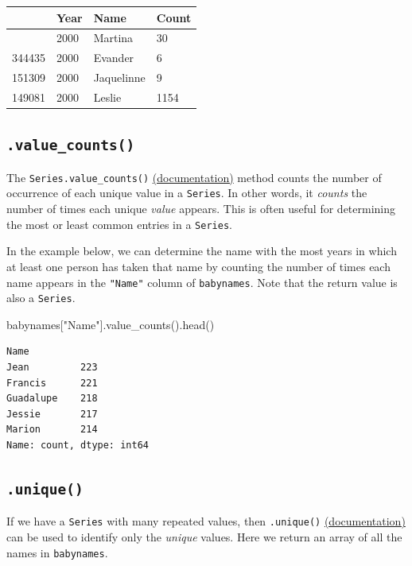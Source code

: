 \documentclass[
  letterpaper,
  DIV=11,
  numbers=noendperiod]{scrreprt}
\newenvironment{Shaded}{\begin{snugshade}}{\end{snugshade}}
\newcommand{\NormalTok}[1]{\textcolor[rgb]{0.00,0.23,0.31}{#1}}
\newcommand{\StringTok}[1]{\textcolor[rgb]{0.13,0.47,0.30}{#1}}
\begin{document}
\begin{longtable}[]{@{}llll@{}}
\toprule\noalign{}
& Year & Name & Count \\
\midrule\noalign{}
\endhead
\bottomrule\noalign{}
\endlastfoot
150048 & 2000 & Martina & 30 \\
344435 & 2000 & Evander & 6 \\
151309 & 2000 & Jaquelinne & 9 \\
149081 & 2000 & Leslie & 1154 \\
\end{longtable}

\subsection{\texorpdfstring{\texttt{.value\_counts()}}{.value\_counts()}}\label{value_counts}

The \texttt{Series.value\_counts()}
\href{https://pandas.pydata.org/docs/reference/api/pandas.Series.value_counts.html}{(documentation)}
method counts the number of occurrence of each unique value in a
\texttt{Series}. In other words, it \emph{counts} the number of times
each unique \emph{value} appears. This is often useful for determining
the most or least common entries in a \texttt{Series}.

In the example below, we can determine the name with the most years in
which at least one person has taken that name by counting the number of
times each name appears in the \texttt{"Name"} column of
\texttt{babynames}. Note that the return value is also a
\texttt{Series}.

\begin{Shaded}
\begin{Highlighting}[]
\NormalTok{babynames[}\StringTok{"Name"}\NormalTok{].value\_counts().head()}
\end{Highlighting}
\end{Shaded}

\begin{verbatim}
Name
Jean         223
Francis      221
Guadalupe    218
Jessie       217
Marion       214
Name: count, dtype: int64
\end{verbatim}

\subsection{\texorpdfstring{\texttt{.unique()}}{.unique()}}\label{unique}

If we have a \texttt{Series} with many repeated values, then
\texttt{.unique()}
\href{https://pandas.pydata.org/docs/reference/api/pandas.unique.html}{(documentation)}
can be used to identify only the \emph{unique} values. Here we return an
array of all the names in \texttt{babynames}.
\end{document}
